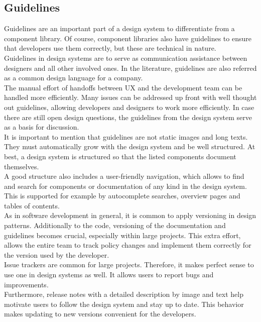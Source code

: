 \subsection{Guidelines}
Guidelines are an important part of a design system to differentiate from a component library. Of course, component libraries also have guidelines to ensure that developers use them correctly, but these are technical in nature.  \\
Guidelines in design systems are to serve as communication assistance between designers and all other involved ones. In the literature, guidelines are also referred as a common design language for a company.\\
The manual effort of handoffs between UX and the development team can be handled more efficiently. Many issues can be addressed up front with well thought out guidelines, allowing developers and designers to work more efficiently. In case there are still open design questions, the guidelines from the design system serve as a basis for discussion. \cite{vesselov_building_2019} \\
It is important to mention that guidelines are not static images and long texts. They must automatically grow with the design system and be well structured. At best, a design system is structured so that the listed components document themselves. \\
A good structure also includes a user-friendly navigation, which allows to find and search for components or documentation of any kind in the design system. This is supported for example by autocomplete searches, overview pages and tables of contents.  \cite{macdonald_practical_2019}\cite{vesselov_building_2019} \\
As in software development in general, it is common to apply versioning in design patterns. Additionally to the code, versioning of the documentation and guidelines becomes crucial, especially within large projects. This extra effort, allows the entire team to track policy changes and implement them correctly for the version used by the developer. \\
Issue trackers are common for large projects. Therefore, it makes perfect sense to use one in design systems as well. It allows users to report bugs and improvements. \\
Furthermore, release notes with a detailed description by image and text help motivate users to follow the design system and stay up to date. This behavior makes updating to new versions convenient for the developers. \cite{macdonald_practical_2019} \\
